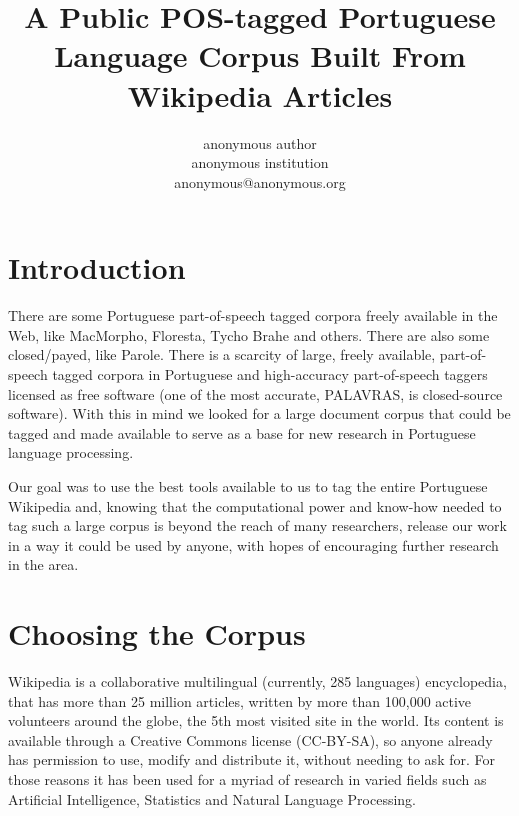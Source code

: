 \documentclass[11pt,a4paper]{article}
\begin{document}
\thispagestyle{empty}

\title{\textbf{A Public POS-tagged Portuguese Language Corpus Built From
               Wikipedia Articles}}
\author{anonymous author\\
anonymous institution\\
anonymous@anonymous.org}

\date{}
\maketitle\thispagestyle{empty}

\section{Introduction}
There are some Portuguese part-of-speech tagged corpora freely available in the
Web, like MacMorpho, Floresta, Tycho Brahe and others. There are also some
closed/payed, like Parole. There is a scarcity of large, freely available,
part-of-speech tagged corpora in Portuguese and high-accuracy part-of-speech
taggers licensed as free software (one of the most accurate, PALAVRAS, is
closed-source software). With this in mind we looked for a large document
corpus that could be tagged and made available to serve as a base for new
research in Portuguese language processing.

Our goal was to use the best tools available to us to tag the entire Portuguese
Wikipedia and, knowing that the computational power and know-how needed to tag
such a large corpus is beyond the reach of many researchers, release our work
in a way it could be used by anyone, with hopes of encouraging further research
in the area.

\section{Choosing the Corpus}

Wikipedia is a collaborative multilingual (currently, 285
languages) encyclopedia, that has more than 25 million articles, written by
more than 100,000 active volunteers around the globe, the 5th most visited site
in the world. Its content is available through a Creative Commons license
(CC-BY-SA), so anyone already has permission to use, modify and
distribute it, without needing to ask for. For those reasons it has been used
for a myriad of research in varied fields such as Artificial Intelligence,
Statistics and Natural Language Processing.
\end{document}
